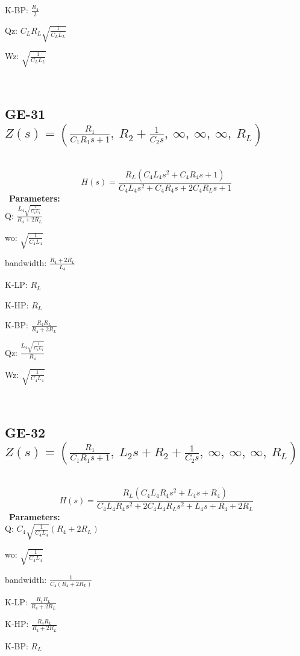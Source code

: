 \documentclass{article}
\begin{document}
K-BP: $\frac{R_{4}}{2}$\ 

Qz: $C_{L} R_{L} \sqrt{\frac{1}{C_{L} L_{L}}}$\ 

Wz: $\sqrt{\frac{1}{C_{L} L_{L}}}$\ 

\ 

\subsection{GE-31 $Z(s) = \left( \frac{R_{1}}{C_{1} R_{1} s + 1}, \  R_{2} + \frac{1}{C_{2} s}, \  \infty, \  \infty, \  \infty, \  R_{L}\right)$ } \ 
\textbf{\[H(s) = \frac{R_{L} \left(C_{4} L_{4} s^{2} + C_{4} R_{4} s + 1\right)}{C_{4} L_{4} s^{2} + C_{4} R_{4} s + 2 C_{4} R_{L} s + 1}\] } \ 
\textbf{Parameters:}\\ 

Q: $\frac{L_{4} \sqrt{\frac{1}{C_{4} L_{4}}}}{R_{4} + 2 R_{L}}$\ 

wo: $\sqrt{\frac{1}{C_{4} L_{4}}}$\ 

bandwidth: $\frac{R_{4} + 2 R_{L}}{L_{4}}$\ 

K-LP: $R_{L}$\ 

K-HP: $R_{L}$\ 

K-BP: $\frac{R_{4} R_{L}}{R_{4} + 2 R_{L}}$\ 

Qz: $\frac{L_{4} \sqrt{\frac{1}{C_{4} L_{4}}}}{R_{4}}$\ 

Wz: $\sqrt{\frac{1}{C_{4} L_{4}}}$\ 

\ 

\subsection{GE-32 $Z(s) = \left( \frac{R_{1}}{C_{1} R_{1} s + 1}, \  L_{2} s + R_{2} + \frac{1}{C_{2} s}, \  \infty, \  \infty, \  \infty, \  R_{L}\right)$ } \ 
\textbf{\[H(s) = \frac{R_{L} \left(C_{4} L_{4} R_{4} s^{2} + L_{4} s + R_{4}\right)}{C_{4} L_{4} R_{4} s^{2} + 2 C_{4} L_{4} R_{L} s^{2} + L_{4} s + R_{4} + 2 R_{L}}\] } \ 
\textbf{Parameters:}\\ 

Q: $C_{4} \sqrt{\frac{1}{C_{4} L_{4}}} \left(R_{4} + 2 R_{L}\right)$\ 

wo: $\sqrt{\frac{1}{C_{4} L_{4}}}$\ 

bandwidth: $\frac{1}{C_{4} \left(R_{4} + 2 R_{L}\right)}$\ 

K-LP: $\frac{R_{4} R_{L}}{R_{4} + 2 R_{L}}$\ 

K-HP: $\frac{R_{4} R_{L}}{R_{4} + 2 R_{L}}$\ 

K-BP: $R_{L}$\ 
\end{document}
